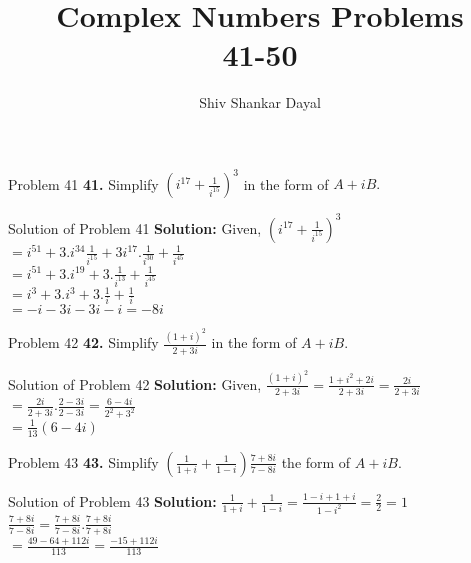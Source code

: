 \documentclass[aspectratio=169,8pt]{beamer}
\title{Complex Numbers Problems\\ 41-50}
\author[Shiv Shankar Dayal]{Shiv Shankar Dayal}
\begin{document}
\begin{frame}
  \titlepage
\end{frame}
\begin{frame}{Problem 41}
  \textbf{41.} Simplify $\left(i^{17} + \frac{1}{i^{15}}\right)^3$ in the form of $A + iB.$
\end{frame}
\begin{frame}{Solution of Problem 41}
  \textbf{Solution:} Given, $\left(i^{17} + \frac{1}{i^{15}}\right)^3$\\
  \vspace*{0.2cm}
  $= i^{51} + 3.i^{34}\frac{1}{i^{15}} + 3i^{17}.\frac{1}{i^{30}} + \frac{1}{i^{45}}$\\
  \vspace*{0.2cm}
  $= i^{51} + 3.i^{19} + 3.\frac{1}{i^{13}} + \frac{1}{i^{45}}$\\
  \vspace*{0.2cm}
  $= i^3 + 3.i^3 + 3.\frac{1}{i} + \frac{1}{i}$\\
  \vspace*{0.2cm}
  $= -i -3i -3i - i = -8i$
\end{frame}
\begin{frame}{Problem 42}
  \textbf{42.} Simplify $\frac{(1 + i)^2}{2 + 3i}$ in the form of $A + iB.$
\end{frame}
\begin{frame}{Solution of Problem 42}
  \textbf{Solution:} Given, $\frac{(1 + i)^2}{2 + 3i} = \frac{1 + i^2 + 2i}{2 + 3i} = \frac{2i}{2 + 3i}$\\
  \vspace*{0.2cm}
  $= \frac{2i}{2 + 3i}.\frac{2 - 3i}{2 - 3i} = \frac{6 - 4i}{2^2 + 3^2}$\\
  \vspace*{0.2cm}
  $= \frac{1}{13}(6 - 4i)$
\end{frame}
\begin{frame}{Problem 43}
  \textbf{43.} Simplify $\left(\frac{1}{1 + i} + \frac{1}{1 - i}\right)\frac{7 + 8i}{7 - 8i}$ the form of $A + iB.$
\end{frame}
\begin{frame}{Solution of Problem 43}
  \textbf{Solution:} $\frac{1}{1 + i} + \frac{1}{1 - i} = \frac{1 - i + 1 + i}{1 - i^2} = \frac{2}{2} = 1$\\
  \vspace*{0.2cm}
  $\frac{7 + 8i}{7 - 8i} = \frac{7 + 8i}{7 - 8i}.\frac{7 + 8i}{7 + 8i}$\\
  \vspace*{0.2cm}
  $= \frac{49 - 64 + 112i}{113} = \frac{-15 + 112i}{113}$
\end{frame}
\end{document}
